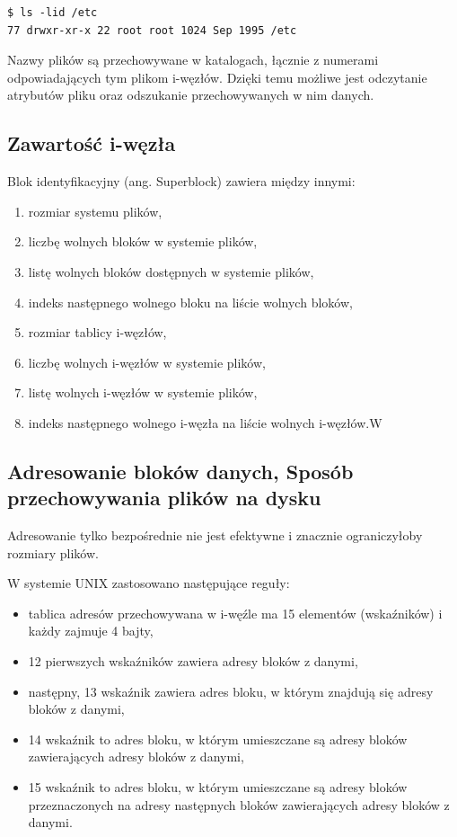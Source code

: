 \documentclass[11pt]{article}
\begin{document}
\begin{verbatim}
$ ls -lid /etc
77 drwxr-xr-x 22 root root 1024 Sep 1995 /etc
\end{verbatim}

Nazwy plików są przechowywane w katalogach, łącznie z numerami odpowiadających tym plikom
i-węzłów. Dzięki temu możliwe jest odczytanie atrybutów pliku oraz odszukanie przechowywanych
w nim danych.


\subsection{Zawartość i-węzła}

Blok identyfikacyjny (ang. Superblock) zawiera między innymi:

\begin{enumerate}
    \item     rozmiar systemu plików,
    \item     liczbę wolnych bloków w systemie plików,
    \item     listę wolnych bloków dostępnych w systemie plików,
    \item     indeks następnego wolnego bloku na liście wolnych bloków,
    \item     rozmiar tablicy i-węzłów,
    \item     liczbę wolnych i-węzłów w systemie plików,
    \item     listę wolnych i-węzłów w systemie plików,
    \item     indeks następnego wolnego i-węzła na liście wolnych i-węzłów.W
\end{enumerate}

\subsection{Adresowanie bloków danych, Sposób przechowywania plików na dysku}

Adresowanie tylko bezpośrednie nie jest efektywne i znacznie ograniczyłoby rozmiary plików.

W systemie UNIX zastosowano następujące reguły:
\begin{itemize}
    \item tablica adresów przechowywana w i-węźle ma 15 elementów (wskaźników) i każdy
          zajmuje 4 bajty,
    \item 12 pierwszych wskaźników zawiera adresy bloków z danymi,
    \item następny, 13 wskaźnik zawiera adres bloku, w którym znajdują się adresy bloków
          z danymi,
    \item 14 wskaźnik to adres bloku, w którym umieszczane są adresy bloków zawierających
          adresy bloków z danymi,
    \item 15 wskaźnik to adres bloku, w którym umieszczane są adresy bloków przeznaczonych
          na adresy następnych bloków zawierających adresy bloków z danymi.
\end{itemize}
\end{document}
